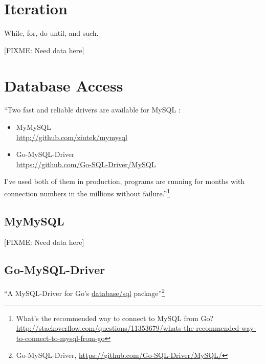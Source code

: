 \documentclass[12pt,letterpaper,dvips]{article}
\newcommand{\FIXME}[1]{\textsf{[FIXME: #1]}}
\begin{document}
\newpage
\section{Iteration}
While, for, do until, and such.

\noindent \FIXME{Need data here}


\newpage
\section{Database Access}
``Two fast and reliable drivers are available for MySQL :

\begin{itemize}
    \item MyMySQL\\
          \href{http://github.com/ziutek/mymysql}{http://github.com/ziutek/mymysql}
    \item Go-MySQL-Driver\\
      \href{https://github.com/Go-SQL-Driver/MySQL/}{https://github.com/Go-SQL-Driver/MySQL}
\end{itemize}

\noindent I've used both of them in production, programs are running for
months with connection numbers in the millions without
failure.''\footnote{What's the recommended way to connect to MySQL from Go?\\
  \href{http://stackoverflow.com/questions/11353679/whats-the-recommended-way-to-connect-to-mysql-from-go}{http://stackoverflow.com/questions/11353679/whats-the-recommended-way-to-connect-to-mysql-from-go}}

\subsection{MyMySQL}
\FIXME{Need data here}


\subsection{Go-MySQL-Driver}
``A MySQL-Driver for Go's
\href{http://golang.org/pkg/database/sql}{database/sql}
package''\footnote{Go-MySQL-Driver, \href{https://github.com/Go-SQL-Driver/MySQL/}{https://github.com/Go-SQL-Driver/MySQL/}}
\end{document}
